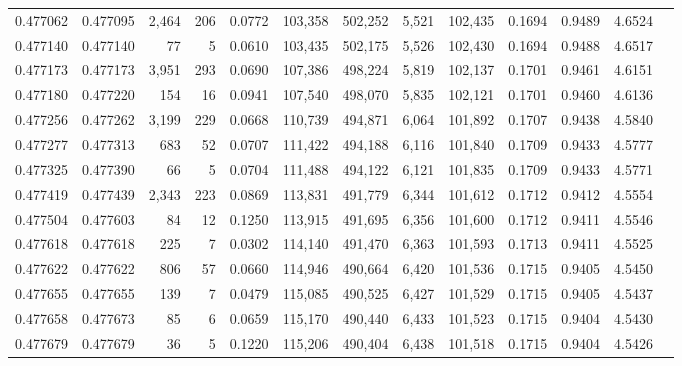 \begin{tabular}{rrrrrrrrrrrrr}
0.477062 & 0.477095 & 2,464 &   206 &                                     0.0772 & 103,358 & 502,252 &   5,521 & 102,435 & 0.1694 & 0.9489 & 4.6524 \\
0.477140 & 0.477140 &    77 &     5 &                                     0.0610 & 103,435 & 502,175 &   5,526 & 102,430 & 0.1694 & 0.9488 & 4.6517 \\
0.477173 & 0.477173 & 3,951 &   293 &                                     0.0690 & 107,386 & 498,224 &   5,819 & 102,137 & 0.1701 & 0.9461 & 4.6151 \\
0.477180 & 0.477220 &   154 &    16 &                                     0.0941 & 107,540 & 498,070 &   5,835 & 102,121 & 0.1701 & 0.9460 & 4.6136 \\
0.477256 & 0.477262 & 3,199 &   229 &                                     0.0668 & 110,739 & 494,871 &   6,064 & 101,892 & 0.1707 & 0.9438 & 4.5840 \\
0.477277 & 0.477313 &   683 &    52 &                                     0.0707 & 111,422 & 494,188 &   6,116 & 101,840 & 0.1709 & 0.9433 & 4.5777 \\
0.477325 & 0.477390 &    66 &     5 &                                     0.0704 & 111,488 & 494,122 &   6,121 & 101,835 & 0.1709 & 0.9433 & 4.5771 \\
0.477419 & 0.477439 & 2,343 &   223 &                                     0.0869 & 113,831 & 491,779 &   6,344 & 101,612 & 0.1712 & 0.9412 & 4.5554 \\
0.477504 & 0.477603 &    84 &    12 &                                     0.1250 & 113,915 & 491,695 &   6,356 & 101,600 & 0.1712 & 0.9411 & 4.5546 \\
0.477618 & 0.477618 &   225 &     7 &                                     0.0302 & 114,140 & 491,470 &   6,363 & 101,593 & 0.1713 & 0.9411 & 4.5525 \\
0.477622 & 0.477622 &   806 &    57 &                                     0.0660 & 114,946 & 490,664 &   6,420 & 101,536 & 0.1715 & 0.9405 & 4.5450 \\
0.477655 & 0.477655 &   139 &     7 &                                     0.0479 & 115,085 & 490,525 &   6,427 & 101,529 & 0.1715 & 0.9405 & 4.5437 \\
0.477658 & 0.477673 &    85 &     6 &                                     0.0659 & 115,170 & 490,440 &   6,433 & 101,523 & 0.1715 & 0.9404 & 4.5430 \\
0.477679 & 0.477679 &    36 &     5 &                                     0.1220 & 115,206 & 490,404 &   6,438 & 101,518 & 0.1715 & 0.9404 & 4.5426 \\

\end{tabular}
